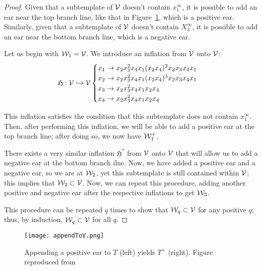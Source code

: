 \documentclass[paper.tex]{subfiles}
\begin{document}
\begin{proof}
    Given that a subtemplate of $\mathcal{V}$ doesn't contain $x_1^\infty$, it is possible to add an ear near the top branch line, like that in Figure~\ref{fig:appendToV}, which is a positive ear. Similarly, given that a subtemplate of $\mathcal{V}$ doesn't contain $X_3^\infty$, it is possible to add an ear near the bottom branch line, which is a negative ear. 

    Let us begin with $\mathcal{W}_1 = \mathcal{V}$. We introduce an inflation from $\mathcal{V}$ onto $\mathcal{V}$: 
    $$\mathfrak{H}: \mathcal{V} \hookrightarrow \mathcal{V} \begin{cases}
        x_1 \rightarrow x_2 x_3^2 x_4 x_1 (x_2 x_4)^2 x_2 x_3 x_4 x_1 \\
        x_2 \rightarrow x_2 x_3^2 x_4 x_1 (x_2 x_4)^3 x_2 x_3 x_4 x_1 \\
        x_3 \rightarrow x_2 x_3^2 x_4 x_1  x_2 x_4  \\
        x_4 \rightarrow x_2 x_3^2 x_4 x_1  x_2 x_4  \end{cases} $$

        This inflation satisfies the condition that this subtemplate does not contain $x_1^\infty$. Then, after performing this inflation, we will be able to add a positive ear at the top branch line; after doing so, we now have $\mathcal{W}_1^+$. 

        There exists a very similar inflation $\mathfrak{H}^*$ from $\mathcal{V}$ onto $\mathcal{V}$ that will allow us to add a negative ear at the bottom branch ilne. Now, we have added a positive ear and a negative ear, so we are at $\mathcal{W}_2$, yet this subtemplate is still contained within $\mathcal{V}$; this implies that $\mathcal{W}_2 \subset \mathcal{V}$. Now, we can repeat this procedure, adding another positive and negative ear after the respective inflations to get $\mathcal{W}_3$. 

        This procedure can be repeated $q$ times to show that $\mathcal{W}_q \subset \mathcal{V}$ for any positive $q$; thus, by induction, $\mathcal{W}_q \subset \mathcal{V}$ for all $q$. 
    \end{proof}


\begin{figure}[h]
    \centering
    \texttt{[image: appendToV.png]}
    \caption{Appending a positive ear to $T$ (left) yields $T^+$ (right). Figure reproduced from~\cite{Ghrist1995}} \label{fig:appendToV} %
\end{figure}



\end{document}
